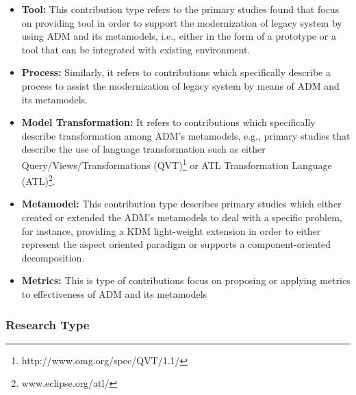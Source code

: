 \begin{itemize}

\item \textbf{Tool:} This contribution type refers to the primary studies found that focus on providing tool in order to support the modernization of legacy system by using ADM and its metamodels, i.e., either in the form of a prototype or a tool that can be integrated with existing environment.




\item \textbf{Process:} Similarly, it refers to contributions which specifically describe a process to assist the modernization of legacy system by means of ADM and its metamodels.

\item \textbf{Model Transformation:} It refers to contributions which specifically describe transformation among ADM's metamodels, e.g., primary studies that describe the use of language transformation such as either Query/Views/Transformations (QVT)\footnote{http://www.omg.org/spec/QVT/1.1/} or ATL Transformation Language (ATL)\footnote{www.eclipse.org/atl/}. 

\item \textbf{Metamodel:} This contribution type describes primary studies which either created or extended the ADM's metamodels to deal with a specific problem, for instance, providing a KDM light-weight extension in order to either represent the aspect oriented paradigm or supports a component-oriented decomposition.


\item \textbf{Metrics:} This is type of contributions focus on proposing or applying metrics to effectiveness of ADM and its metamodels

\end{itemize}

\subsubsection{Research Type}\label{research_type}

